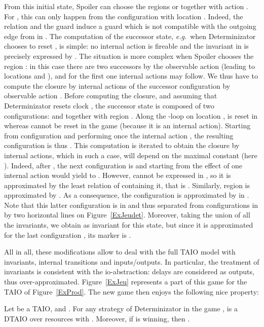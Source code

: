 \documentclass{LMCS}
\theoremstyle{plain}\newtheorem{proposition}[thm]{Proposition}
\def\eg{{\em e.g.}}
\begin{document}
\begin{exa}
From this initial state, Spoiler can choose the regions  or
 together with action . For , this can only happen
from the configuration with location . Indeed, the relation  and the guard  induce a guard  which is not
compatible with the outgoing edge from  in . The
computation of the successor state, \eg~when Determinizator chooses to
reset , is simple: no internal action is fireable and the
invariant in  is precisely expressed by . The situation
is more complex when Spoiler chooses the region : in this case
there are two successors by the observable action  (leading to
locations  and ), and for the first one internal actions
may follow. We thus have to compute the closure by internal actions of
the successor configuration by observable action . Before
computing the closure, and assuming that Determinizator resets clock
, the successor state is composed of two configurations:
 and  together with region
. Along the -loop on location ,  is reset in
 whereas  cannot be reset in the game (because it is an
internal action). Starting from configuration  and performing once the internal action , the
resulting configuration is thus . This
computation is iterated to obtain the closure by internal actions,
which in such a case, will depend on the maximal constant (here
). Indeed, after , the next
configuration is  and starting from
 the effect of one internal action would
yield to . However,  cannot be
expressed in , so it is approximated by the least
relation of  containing it, that is
. Similarly, region  is approximated by . As a
consequence, the configuration  is
approximated by  in . Note that
this latter configuration is in  and thus separated
from configurations in  by two horizontal lines on
Figure~\ref{ExJeudet}.
Moreover, taking the union of all the invariants, we obtain  as
invariant for this state, but since it is approximated for the last
configuration , its marker is .
\end{exa}

All in all, these modifications allow to deal with the full TAIO model
with invariants, internal transitions and inputs/outputs.  In
particular, the treatment of invariants is consistent with the
io-abstraction: delays are considered as outputs, thus
over-approximated.
Figure~\ref{ExJeu} represents a part of this game for the TAIO of Figure~\ref{ExProd}.
The new game then enjoys the following nice
property:\begin{prop}
\label{altSim}
  Let  be a TAIO, and . 
  For any
  strategy  of Determinizator in the game
  ,  is a
  DTAIO over resources  with . 
  Moreover, if  is winning, then
  .
\end{prop}
\end{document}
